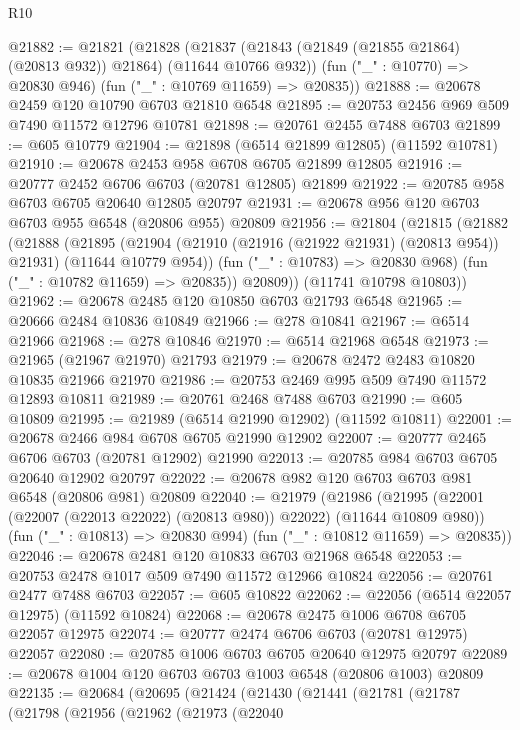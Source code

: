 \begin{lexlean}{R10}
\begin{coremodule}
{{{{{{{{{{{{{{{{{{{{{{{{{{{{{{{{{{{{{{{{{{{{{{{{{{{{{{{{{{{{{{{{{{{{{{{{{{{{{{{{{{{{@21882 := @21821
    (@21828
      (@21837 (@21843 (@21849 (@21855 @21864) (@20813 @932)) @21864) (@11644 @10766 @932))
      (fun ("_" : @10770) => @20830 @946)
      (fun ("_" : @10769 @11659) => @20835))
@21888 := @20678 @2459 @120 @10790 @6703 @21810 @6548
@21895 := @20753 @2456 @969 @509 @7490 @11572 @12796 @10781
@21898 := @20761 @2455 @7488 @6703
@21899 := @605 @10779
@21904 := @21898 (@6514 @21899 @12805) (@11592 @10781)
@21910 := @20678 @2453 @958 @6708 @6705 @21899 @12805
@21916 := @20777 @2452 @6706 @6703 (@20781 @12805) @21899
@21922 := @20785 @958 @6703 @6705 @20640 @12805 @20797
@21931 := @20678 @956 @120 @6703 @6703 @955 @6548 (@20806 @955) @20809
@21956 := @21804
    (@21815
      (@21882
        (@21888
          (@21895
            (@21904 (@21910 (@21916 (@21922 @21931) (@20813 @954)) @21931) (@11644 @10779 @954))
            (fun ("_" : @10783) => @20830 @968)
            (fun ("_" : @10782 @11659) => @20835))
          @20809))
      (@11741 @10798 @10803))
@21962 := @20678 @2485 @120 @10850 @6703 @21793 @6548
@21965 := @20666 @2484 @10836 @10849
@21966 := @278 @10841
@21967 := @6514 @21966
@21968 := @278 @10846
@21970 := @6514 @21968 @6548
@21973 := @21965 (@21967 @21970) @21793
@21979 := @20678 @2472 @2483 @10820 @10835 @21966 @21970
@21986 := @20753 @2469 @995 @509 @7490 @11572 @12893 @10811
@21989 := @20761 @2468 @7488 @6703
@21990 := @605 @10809
@21995 := @21989 (@6514 @21990 @12902) (@11592 @10811)
@22001 := @20678 @2466 @984 @6708 @6705 @21990 @12902
@22007 := @20777 @2465 @6706 @6703 (@20781 @12902) @21990
@22013 := @20785 @984 @6703 @6705 @20640 @12902 @20797
@22022 := @20678 @982 @120 @6703 @6703 @981 @6548 (@20806 @981) @20809
@22040 := @21979
    (@21986
      (@21995 (@22001 (@22007 (@22013 @22022) (@20813 @980)) @22022) (@11644 @10809 @980))
      (fun ("_" : @10813) => @20830 @994)
      (fun ("_" : @10812 @11659) => @20835))
@22046 := @20678 @2481 @120 @10833 @6703 @21968 @6548
@22053 := @20753 @2478 @1017 @509 @7490 @11572 @12966 @10824
@22056 := @20761 @2477 @7488 @6703
@22057 := @605 @10822
@22062 := @22056 (@6514 @22057 @12975) (@11592 @10824)
@22068 := @20678 @2475 @1006 @6708 @6705 @22057 @12975
@22074 := @20777 @2474 @6706 @6703 (@20781 @12975) @22057
@22080 := @20785 @1006 @6703 @6705 @20640 @12975 @20797
@22089 := @20678 @1004 @120 @6703 @6703 @1003 @6548 (@20806 @1003) @20809
@22135 := @20684
    (@20695
      (@21424
        (@21430
          (@21441
            (@21781
              (@21787
                (@21798
                  (@21956
                    (@21962
                      (@21973
                        (@22040
}}}}}}}}}}}}}}}}}}}}}}}}}}}}}}}}}}}}}}}}}}}}}}}}}}}}}}}}}}}}}}}}}}}}}}}}}}}}}}}}}}}}
\end{coremodule}
\end{lexlean}
